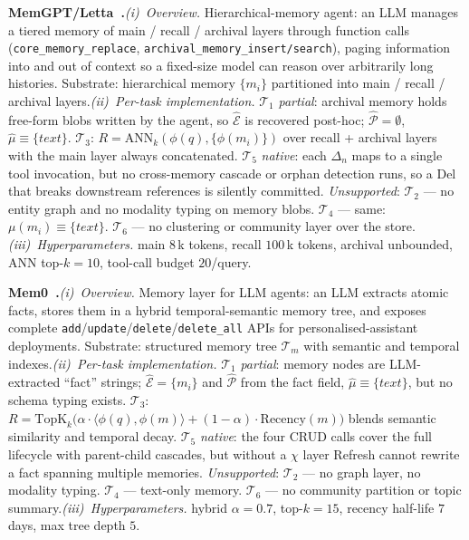 \documentclass{article}
\begin{document}
\noindent\textbf{MemGPT/Letta~\citep{MemGPT}.}\quad\emph{(i)~Overview.} Hierarchical-memory agent: an LLM manages a tiered memory of main / recall / archival layers through function calls (\texttt{core\_memory\_replace}, \texttt{archival\_memory\_insert/search}), paging information into and out of context so a fixed-size model can reason over arbitrarily long histories. Substrate: hierarchical memory $\{m_i\}$ partitioned into main / recall / archival layers.\quad\emph{(ii)~Per-task implementation.} $\mathcal{T}_1$ \emph{partial}: archival memory holds free-form blobs written by the agent, so $\hat{\mathcal{E}}$ is recovered post-hoc; $\hat{\mathcal{P}}\!=\!\emptyset$, $\hat{\mu}\!\equiv\!\{\textit{text}\}$. $\mathcal{T}_3$: $R\!=\!\mathrm{ANN}_{k}(\phi(q),\{\phi(m_i)\})$ over recall + archival layers with the main layer always concatenated. $\mathcal{T}_5$ \emph{native}: each $\Delta_n$ maps to a single tool invocation, but no cross-memory cascade or orphan detection runs, so a Del that breaks downstream references is silently committed. \emph{Unsupported}: $\mathcal{T}_2$ — no entity graph and no modality typing on memory blobs. $\mathcal{T}_4$ — same: $\mu(m_i)\!\equiv\!\{\textit{text}\}$. $\mathcal{T}_6$ — no clustering or community layer over the store.\quad\emph{(iii)~Hyperparameters.} main $8$\,k tokens, recall $100$\,k tokens, archival unbounded, ANN top-$k\!=\!10$, tool-call budget $20$/query.

\noindent\textbf{Mem0~\citep{Mem0}.}\quad\emph{(i)~Overview.} Memory layer for LLM agents: an LLM extracts atomic facts, stores them in a hybrid temporal-semantic memory tree, and exposes complete \texttt{add}/\texttt{update}/\texttt{delete}/\texttt{delete\_all} APIs for personalised-assistant deployments. Substrate: structured memory tree $\mathcal{T}_m$ with semantic and temporal indexes.\quad\emph{(ii)~Per-task implementation.} $\mathcal{T}_1$ \emph{partial}: memory nodes are LLM-extracted ``fact'' strings; $\hat{\mathcal{E}}\!=\!\{m_i\}$ and $\hat{\mathcal{P}}$ from the fact field, $\hat{\mu}\!\equiv\!\{\textit{text}\}$, but no schema typing exists. $\mathcal{T}_3$: $R\!=\!\mathrm{TopK}_{k}\!\bigl(\alpha\!\cdot\!\langle\phi(q),\phi(m)\rangle\!+\!(1\!-\!\alpha)\!\cdot\!\mathrm{Recency}(m)\bigr)$ blends semantic similarity and temporal decay. $\mathcal{T}_5$ \emph{native}: the four CRUD calls cover the full lifecycle with parent-child cascades, but without a $\chi$ layer Refresh cannot rewrite a fact spanning multiple memories. \emph{Unsupported}: $\mathcal{T}_2$ — no graph layer, no modality typing. $\mathcal{T}_4$ — text-only memory. $\mathcal{T}_6$ — no community partition or topic summary.\quad\emph{(iii)~Hyperparameters.} hybrid $\alpha\!=\!0.7$, top-$k\!=\!15$, recency half-life $7$ days, max tree depth $5$.
\end{document}
